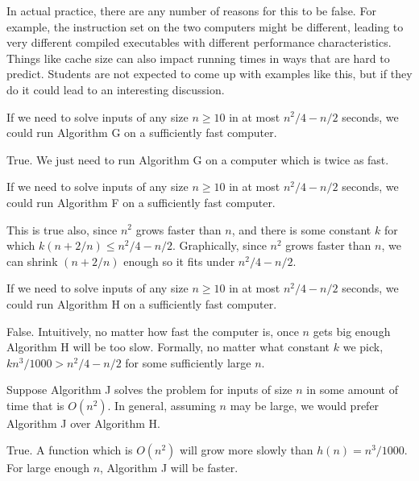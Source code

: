 \documentclass{tufte-handout}
\begin{document}
\begin{questions}
\begin{subquestions}
\begin{answer}
        In actual practice, there are any number of reasons for this
        to be false.  For example, the instruction set on the two
        computers might be different, leading to very different
        compiled executables with different performance
        characteristics.  Things like cache size can also impact
        running times in ways that are hard to predict.  Students are
        not expected to come up with examples like this, but if they
        do it could lead to an interesting discussion.
      \end{answer}
    \item If we need to solve inputs of any size $n \geq 10$ in at most
      $n^2/4 - n/2$ seconds, we could run Algorithm G on a sufficiently
      fast computer.
      \begin{answer}
        True. We just need to run Algorithm G on a computer which is
        twice as fast.
      \end{answer}
    \item If we need to solve inputs of any size $n \geq 10$ in at most
      $n^2/4 - n/2$ seconds, we could run Algorithm F on a sufficiently
      fast computer.
      \begin{answer}
        This is true also, since $n^2$ grows faster than $n$, and
        there is some constant $k$ for which
        $k(n + 2/n) \leq n^2/4 - n/2$.  Graphically, since $n^2$ grows
        faster than $n$, we can shrink $(n + 2/n)$ enough so it fits
        under $n^2/4 - n/2$.
      \end{answer}
    \item If we need to solve inputs of any size $n \geq 10$ in at most
      $n^2/4 - n/2$ seconds, we could run Algorithm H on a sufficiently
      fast computer.
      \begin{answer}
        False.  Intuitively, no matter how fast the computer is, once
        $n$ gets big enough Algorithm H will be too slow.  Formally,
        no matter what constant $k$ we pick, $kn^3/1000 > n^2/4 - n/2$
        for some sufficiently large $n$.
      \end{answer}
    \item Suppose Algorithm J solves the problem for inputs of size
      $n$ in some amount of time that is $O(n^2)$.  In general,
      assuming $n$ may be large, we would prefer Algorithm J over
      Algorithm H.
      \begin{answer}
        True.  A function which is $O(n^2)$ will grow more slowly than
        $h(n) = n^3/1000$.  For large enough $n$, Algorithm J will be
        faster.
      \end{answer}
  \end{subquestions}


\end{questions}
\end{document}
